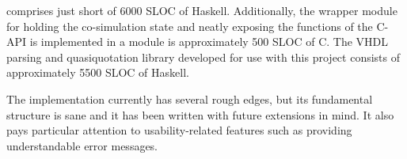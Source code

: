 \libsme{} comprises just short of 6000 SLOC of Haskell. Additionally, the
wrapper module for holding the co-simulation state and neatly exposing the
functions of the C-API is implemented in a module is approximately 500 SLOC of
C. The VHDL parsing and quasiquotation library developed for use with this
project consists of approximately 5500 SLOC of Haskell.

The implementation currently has several rough edges, but its fundamental
structure is sane and it has been written with future extensions in mind. It
also pays particular attention to usability-related features such as providing
understandable error messages.

